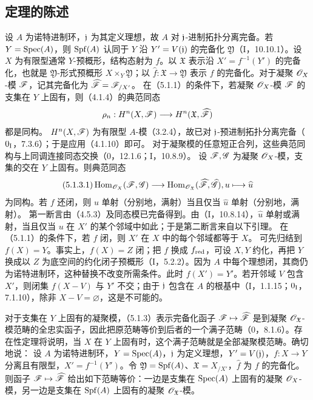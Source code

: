 \subsection{定理的陈述}
设 $A$ 为诺特进制环，$\mathfrak j$ 为其定义理想，故 $A$ 对 $\mathfrak j$-进制拓扑分离完备。若 $Y=\operatorname{Spec}(A)$，则 $\operatorname{Spf}(A)$ 认同于 $Y$ 沿 $Y'=V(\mathfrak j)$ 的完备化 $\mathfrak Y$（I，10.10.1）。设 $X$ 为有限型通常 $Y$-预概形，结构态射为 $f$。以 $\mathfrak X$ 表示沿 $X'=f^{-1}(Y')$ 的完备化，也就是 $\mathfrak Y$-形式预概形 $X\times_Y\mathfrak Y$；以 $\widehat f:\mathfrak X\to\mathfrak Y$ 表示 $f$ 的完备化。对于凝聚 $\mathscr O_X$-模 $\mathscr F$，记其完备化为 $\widehat{\mathscr F}=\mathscr F_{/X'}$。
在（5.1.1）的条件下，若凝聚 $\mathscr O_X$-模 $\mathscr F$ 的支集在 $Y$ 上固有，则（4.1.4）的典范同态
\[
\rho_n:H^n(X,\mathscr F)\longrightarrow H^n(\mathfrak X,\widehat{\mathscr F})
\]
都是同构。
\eproof
$H^n(X,\mathscr F)$ 为有限型 $A$-模（3.2.4），故已对 $\mathfrak j$-预进制拓扑分离完备（$0_{\mathrm I}$，7.3.6）；于是应用（4.1.10）即可。\finishproof
对于凝聚模的任意短正合列，这些典范同构与上同调连接同态交换（0，12.1.6；I，10.8.9）。
设 $\mathscr F,\mathscr G$ 为凝聚 $\mathscr O_X$-模，支集的交在 $Y$ 上固有。则典范同态
\begin{equation}\tag{5.1.3.1}
\Hom_{\OO_X}(\F,\G)\longrightarrow
\Hom_{\OO_{\mathfrak X}}(\widehat\F,\widehat\G),\qquad u\longmapsto\widehat u
\end{equation}
为同构。若 $f$ 还闭，则 $u$ 单射（分别地，满射）当且仅当 $\widehat u$ 单射（分别地，满射）。
\eproof
第一断言由（4.5.3）及同态模已完备得到。由（I，10.8.14），$\widehat u$ 单射或满射，当且仅当 $u$ 在 $X'$ 的某个邻域中如此；于是第二断言来自以下引理。\finishproof
{}
在（5.1.1）的条件下，若 $f$ 闭，则 $X'$ 在 $X$ 中的每个邻域都等于 $X$。
\eproof
可先归结到 $f(X)=Y$。事实上，$f(X)=Z$ 闭；把 $f$ 换成 $f_{\mathrm{red}}$，可设 $X,Y$ 约化，再把 $Y$ 换成以 $Z$ 为底空间的约化闭子预概形（I，5.2.2）。因为 $A$ 中每个理想闭，其商仍为诺特进制环，这种替换不改变所需条件。此时 $f(X')=Y'$。若开邻域 $V$ 包含 $X'$，则闭集 $f(X-V)$ 与 $Y'$ 不交；由于 $\mathfrak j$ 包含在 $A$ 的根基中（I，1.1.15；$0_{\mathrm I}$，7.1.10），除非 $X-V=\varnothing$，这是不可能的。\finishproof

对于支集在 $Y$ 上固有的凝聚模，（5.1.3）表示完备化函子 $\mathscr F\mapsto\widehat{\mathscr F}$ 是到凝聚 $\mathscr O_{\mathfrak X}$-模范畴的全忠实函子，因此把原范畴等价到后者的一个满子范畴（0，8.1.6）。存在性定理将说明，当 $X$ 在 $Y$ 上固有时，这个满子范畴就是全部凝聚模范畴。确切地说：
设 $A$ 为诺特进制环，$Y=\operatorname{Spec}(A)$，$\mathfrak j$ 为定义理想，$Y'=V(\mathfrak j)$，$f:X\to Y$ 分离且有限型，$X'=f^{-1}(Y')$。令 $\mathfrak Y=\operatorname{Spf}(A)$、$\mathfrak X=X_{/X'}$，$\widehat f$ 为 $f$ 的完备化。则函子 $\mathscr F\mapsto\widehat{\mathscr F}$ 给出如下范畴等价：一边是支集在 $\operatorname{Spec}(A)$ 上固有的凝聚 $\mathscr O_X$-模，另一边是支集在 $\operatorname{Spf}(A)$ 上固有的凝聚 $\mathscr O_{\mathfrak X}$-模。

